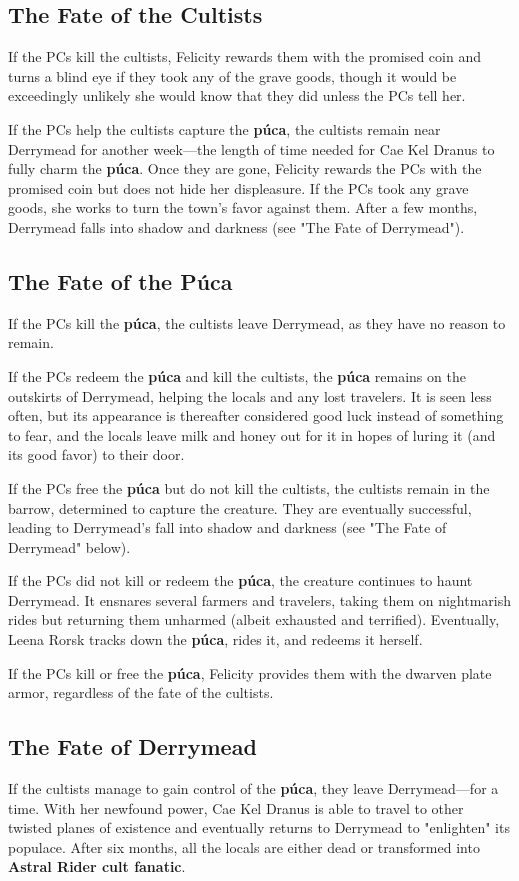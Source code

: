 \documentclass[10pt,a4paper,twoside,bg=print,twocolumn,openany,nodeprecatedcode]{dndbook}
\begin{document}
\subsection{The Fate of the Cultists}
If the PCs kill the cultists, Felicity rewards them with the promised coin and turns a blind eye if they took any of the grave goods, though it would be exceedingly unlikely she would know that they did unless the PCs tell her.

If the PCs help the cultists capture the \textbf{púca}, the cultists remain near Derrymead for another week—the length of time needed for Cae Kel Dranus to fully charm the \textbf{púca}. Once they are gone, Felicity rewards the PCs with the promised coin but does not hide her displeasure. If the PCs took any grave goods, she works to turn the town's favor against them. After a few months, Derrymead falls into shadow and darkness (see "The Fate of Derrymead").

\subsection{The Fate of the Púca}
If the PCs kill the \textbf{púca}, the cultists leave Derrymead, as they have no reason to remain.

If the PCs redeem the \textbf{púca} and kill the cultists, the \textbf{púca} remains on the outskirts of Derrymead, helping the locals and any lost travelers. It is seen less often, but its appearance is thereafter considered good luck instead of something to fear, and the locals leave milk and honey out for it in hopes of luring it (and its good favor) to their door.

If the PCs free the \textbf{púca} but do not kill the cultists, the cultists remain in the barrow, determined to capture the creature. They are eventually successful, leading to Derrymead's fall into shadow and darkness (see "The Fate of Derrymead" below).

If the PCs did not kill or redeem the \textbf{púca}, the creature continues to haunt Derrymead. It ensnares several farmers and travelers, taking them on nightmarish rides but returning them unharmed (albeit exhausted and terrified). Eventually, Leena Rorsk tracks down the \textbf{púca}, rides it, and redeems it herself.

If the PCs kill or free the \textbf{púca}, Felicity provides them with the dwarven plate armor, regardless of the fate of the cultists.

\subsection{The Fate of Derrymead}
If the cultists manage to gain control of the \textbf{púca}, they leave Derrymead—for a time. With her newfound power, Cae Kel Dranus is able to travel to other twisted planes of existence and eventually returns to Derrymead to "enlighten" its populace. After six months, all the locals are either dead or transformed into \textbf{Astral Rider cult fanatic}.
\end{document}
